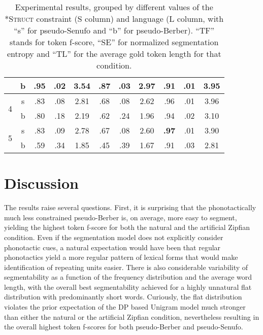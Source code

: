 \documentclass[11pt]{article}
\begin{document}
\begin{table*}[t!]
\begin{center}
{\begin{tabular}{|c|c||c|c|c||c|c|c||c|c|c|}
\cline{2-11} 
 & b & \textbf{.95} & .02 & 3.54 & .87 & .03 & 2.97 & .91 & .01 & 3.95\tabularnewline
\hline 
\hline 
\multirow{2}{*}{4} & s & .83 & .08 & 2.81 & .68 & .08 & 2.62 & .96 & .01 & 3.96\tabularnewline
\cline{2-11} 
 & b & .80 & .18 & 2.19 & .62 & .24 & 1.96 & .94 & .02 & 3.10\tabularnewline
\hline 
\hline 
\multirow{2}{*}{5} & s & .83 & .09 & 2.78 & .67 & .08 & 2.60 & \textbf{.97}  & .01 & 3.90\tabularnewline
\cline{2-11} 
 & b & .59  & .34 & 1.85 & .45 & .39 & 1.67 & .91  & .03 & 2.81\tabularnewline
\hline 
\end{tabular}}
\end{center}
\caption{\label{Results.}Experimental results, grouped by different values of the \textsc{*Struct} constraint (S column) and language (L column, with ``s'' for pseudo-Senufo and ``b'' for pseudo-Berber). ``TF'' stands for token f-score, ``SE'' for normalized segmentation entropy and ``TL'' for the average gold token length for that condition.}	
\end{table*}

\section{Discussion}
\vspace*{-5pt}
The results raise several questions. First, it is surprising that the phonotactically much less constrained pseudo-Berber is, on average, more easy to segment, yielding the highest token f-score for both the natural and the artificial Zipfian condition. Even if the segmentation model does not explicitly consider phonotactic cues, a natural expectation would have been that regular phonotactics yield a more regular pattern of lexical forms that would make identification of repeating units easier. There is also considerable variability of segmentability as a function of the frequency distribution and the average word length, with the overall best segmentability achieved for a highly unnatural flat distribution with predominantly short words. Curiously, the flat distribution violates the prior expectation of the DP based Unigram model much stronger than either the natural or the artificial Zipfian condition, nevertheless resulting in the overall highest token f-scores for both pseudo-Berber and pseudo-Senufo.
\end{document}
